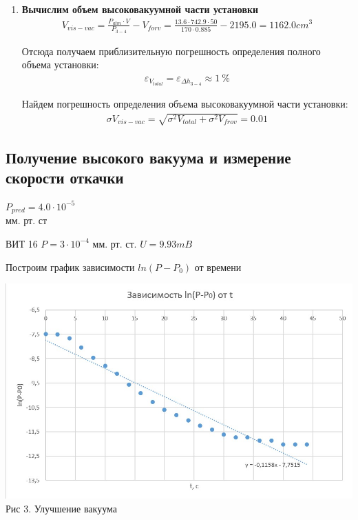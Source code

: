 \documentclass[a4paper, 12pt]{article}
\begin{document}
\begin{enumerate}
\item \textbf{Вычислим объем высоковакуумной части установки}\\ 
\begin{align}
	V_{vis-vac} = \frac{P_{atm}\cdot V}{P_{3-4}} - V_{forv} = \frac{13.6 \cdot 742.9 \cdot 50}{170 \cdot 0.885} -  2195.0 =  1162.0 cm^3
\end{align}

Отсюда получаем приблизительную погрешность определения полного объема установки:
\begin{align}
		\varepsilon_{V_{total}} = \varepsilon_{\Delta h_{3-4}} \approx 1~\%
\end{align}

Найдем погрешность определения объема высоковакуумной части установки:
\begin{align}
	\sigma V_{vis-vac} = \sqrt{\sigma^2 V_{total} + \sigma^2 V_{frov}} = 0.01
\end{align}
	
\end{enumerate}

\subsection{Получение высокого вакуума и измерение скорости откачки}

$P_{pred} = 4.0 \cdot 10^{-5}$\\ мм. рт. ст

ВИТ 16 $P = 3 \cdot 10^{-4}$ мм. рт. ст.
$U = 9.93 mB$

Построим график зависимости $ln(P-P_0)$ от времени \\

\begin{center}
	\includegraphics[width=15cm]{13.jpg}
	Рис 3. Улучшение вакуума
\end{center}
\end{document}
